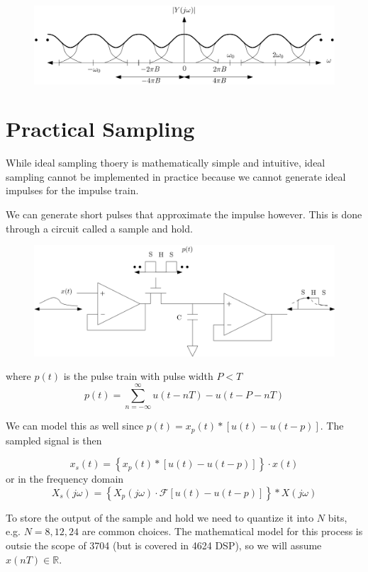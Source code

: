 \documentclass{article}
\begin{document}
\begin{figure}
  \centering
  \includegraphics[width=0.8\linewidth, alt="cartoon of the magnitude spectrum of a band-limited signal after sampling below the Nyquist rate"]{bandlimitedsampled2.svg}
\end{figure}

\section{Practical Sampling}

While ideal sampling thoery is mathematically simple and intuitive, ideal sampling cannot be implemented in practice because we cannot generate ideal impulses for the impulse train.

We can generate short pulses that approximate the impulse however. This is done through a circuit called a sample and hold.

\begin{figure}
  \centering
  \includegraphics[width=0.8\linewidth, alt="schematic of a circuit implementing a sample and hold"]{sample_hold.svg}
\end{figure}
where $p(t)$ is the pulse train with pulse width $P < T$
\[
p(t) = \sum\limits_{n=-\infty}^{\infty} u(t-nT) - u(t-P-nT)
\]

We can model this as well since $p(t) = x_p(t) * \left[u(t) - u(t-p) \right]$. The sampled signal is then

\[
x_s(t) = \left\{ x_p(t) * \left[u(t) - u(t-p) \right] \right\}\cdot x(t)
\]
or in the frequency domain
\[
X_s(j\omega) = \left\{ X_p(j\omega)\cdot \mathcal{F}\left[u(t) - u(t-p) \right] \right\}* X(j\omega)
\]

To store the output of the sample and hold we need to quantize it into $N$ bits, e.g. $N = 8, 12, 24$ are common choices. The mathematical model for this process is outsie the scope of 3704 (but is covered in 4624 DSP), so we will assume $x(nT) \in\mathbb{R}$.
\end{document}
